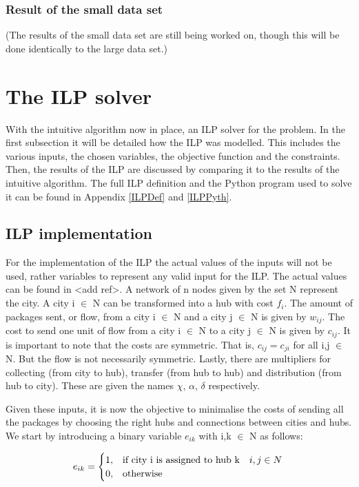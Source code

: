 \documentclass{article}
\begin{document}
\subsubsection{Result of the small data set}
(The results of the small data set are still being worked on, though this will be done identically to the large data set.)

 
\newpage  
\section{The ILP solver}
\label{LPSolver}
With the intuitive algorithm now in place, an ILP solver for the problem. In the first subsection it will be detailed how the ILP was modelled. This includes the various inputs, the chosen variables, the objective function and the constraints. Then, the results of the ILP are discussed by comparing it to the results of the intuitive algorithm. The full ILP definition and the Python program used to solve it can be found in Appendix \ref{ILPDef} and \ref{ILPPyth}.

\subsection{ILP implementation}
For the implementation of the ILP the actual values of the inputs will not be used, rather variables to represent any valid input for the ILP. The actual values can be found in <add ref>. A network of n nodes given by the set N represent the city. A city i $\in$ N can be transformed into a hub with cost $f_i$. The amount of packages sent, or flow, from a city i $\in$ N and a city j $\in$ N is given by $w_{ij}$. The cost to send one unit of flow from a city i $\in$ N to a city j $\in$ N is given by $c_{ij}$. It is important to note that the costs are symmetric. That is, $c_{ij} = c_{ji}$ for all i,j $\in$ N. But the flow is not necessarily symmetric. Lastly, there are multipliers for collecting (from city to hub), transfer (from hub to hub) and distribution (from hub to city). These are given the names $\chi$, $\alpha$, $\delta$ respectively.
    
Given these inputs, it is now the objective to minimalise the costs of sending all the packages by choosing the right hubs and connections between cities and hubs. We start by introducing a binary variable $e_{ik}$ with i,k $\in$ N as follows:
    
$$
e_{ik} =
\begin{cases} 
1, & \text{if city i is assigned to hub k} \quad i,j \in N  \\ 
0, & \text{otherwise}
\end{cases} \\
$$
\end{document}
